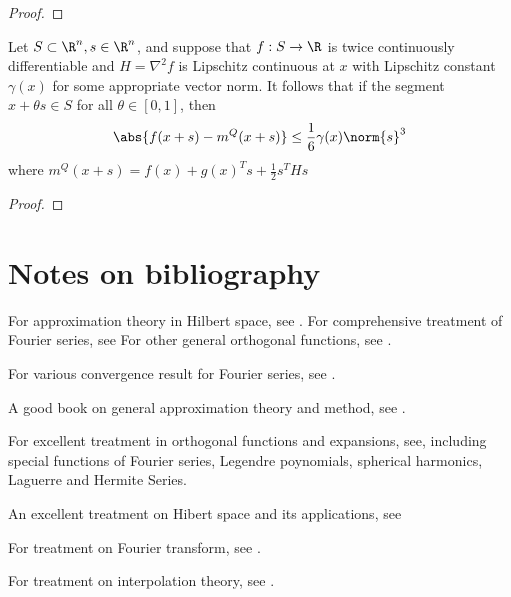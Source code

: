 \begin{refsection}
\begin{proof}
\end{proof}


\begin{theorem}
	Let $S\subset \R^n,s\in \R^n$, and suppose that $f:S\to \R$ is twice continuously differentiable and $H = \nabla^2 f$ is Lipschitz continuous at $x$ with Lipschitz constant $\gamma(x)$ for some appropriate vector norm. It follows that if the segment $x+\theta s \in S$ for all $\theta \in [0,1]$, then
	$$\abs{f(x+s) - m^Q(x+s)} \leq \frac{1}{6} \gamma (x)\norm{s}^3$$
	where $m^Q(x+s) = f(x) + g(x)^Ts + \frac{1}{2}s^THs$
\end{theorem}
\begin{proof}
	
\end{proof}






\section{Notes on bibliography}


For approximation theory in Hilbert space, see \cite{moon2000mathematical}. For comprehensive treatment of Fourier series, see\cite{kaplan1973advanced}\cite{stein2011fourier}
For other general orthogonal functions, see \cite{moon2000mathematical}\cite{kaplan1973advanced}.

For various convergence result for Fourier series, see \cite{wiki:fourierconvergence}.

A good book on general approximation theory and method, see \cite{powell1981approximation}.

For excellent treatment in orthogonal functions and expansions, see\cite{sansone2004orthogonal}, including special functions of Fourier series, Legendre poynomials, spherical harmonics, Laguerre and Hermite Series. 

An excellent treatment on Hibert space and its applications, see \cite{debnath2005hilbert}\cite{holland2007applied}\cite{duren2012invitation}

For treatment on Fourier transform, see \cite{holland2007applied}.

For treatment on interpolation theory, see \cite{atkinson1989introduction}.

\printbibliography

\end{refsection}

